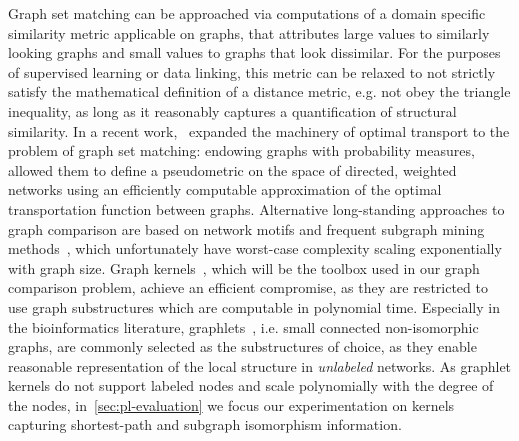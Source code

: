 Graph set matching can be approached via computations of a domain specific similarity metric applicable on graphs, that attributes large values to similarly looking graphs and small values to graphs that look dissimilar. For the purposes of supervised learning or data linking, this metric can be relaxed to not strictly satisfy the mathematical definition of a distance metric, e.g. not obey the triangle inequality, as long as it reasonably captures a quantification of structural similarity. In a recent work,~\textcite{chowdhury19} expanded the machinery of optimal transport to the problem of graph set matching: endowing graphs with probability measures, allowed them to define a pseudometric on the space of directed, weighted networks using an efficiently computable approximation of the optimal transportation function between graphs. Alternative long-standing approaches to graph comparison are based on network motifs and frequent subgraph mining methods~\citep{milo02,Yan2002}, which unfortunately have worst-case complexity scaling exponentially with graph size. Graph kernels~\citep{Vishwanathan2010}, which will be the toolbox used in our graph comparison problem, achieve an efficient compromise, as they are restricted to use graph substructures which are computable in polynomial time. Especially in the bioinformatics literature, graphlets~\citep{przulj07,shervashidze09}, i.e. small connected non-isomorphic graphs, are commonly selected as the substructures of choice, as they enable reasonable representation of the local structure in \emph{unlabeled} networks. As graphlet kernels do not support labeled nodes and scale polynomially with the degree of the nodes, in~\cref{sec:pl-evaluation} we focus our experimentation on kernels capturing shortest-path and subgraph isomorphism information.
